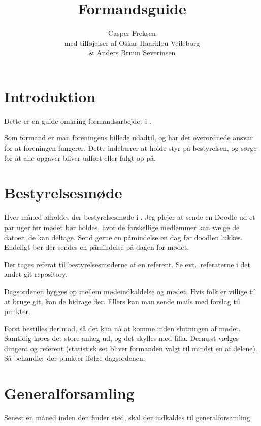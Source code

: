 

\title{Formandsguide}
\date{}
\author{Casper Freksen\\
\small med tilføjelser af Oskar Haarklou Veileborg\\
\small \& Anders Bruun Severinsen}



\maketitle

\section{Introduktion}
\label{sec:introduktion}

Dette er en guide omkring formandsarbejdet i \fredagscafeen.

Som formand er man foreningens billede udadtil, og har det overordnede ansvar for
at foreningen fungerer. Dette indebærer at holde styr på bestyrelsen, og
sørge for at alle opgaver bliver udført eller fulgt op på.

\section{Bestyrelsesmøde}
\label{sec:bestyrelsesmode}

Hver måned afholdes der bestyrelsesmøde i \fredagscafeen. Jeg plejer at
sende en Doodle ud et par uger før mødet bør holdes, hvor de forskellige medlemmer kan
vælge de datoer, de kan deltage. Send gerne en påmindelse en dag før doodlen
lukkes. Endeligt bør der sendes en påmindelse på dagen for mødet.

Der tages referat til bestyrelsesmøderne af en referent. Se
evt.~referaterne i det andet git repository.

Dagsordenen bygges op mellem mødeindkaldelse og mødet. Hvis folk er
villige til at bruge git, kan de bidrage der. Ellers kan man sende
mails med forslag til punkter.

Først bestilles der mad, så det kan nå at komme inden slutningen af
mødet. Samtidig køres det store anlæg ud, og det skylles med
lilla. Dernæst vælges dirigent og referent (statistisk set bliver
formanden valgt til mindst en af delene). Så behandles der punkter
ifølge dagsordenen.

\section{Generalforsamling}
\label{sec:generalforsamling}
Senest en måned inden den finder sted, skal der indkaldes til generalforsamling.

